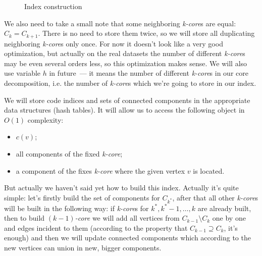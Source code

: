 \begin{figure}[!h]
\caption{Index construction}\label{index-construct}
\centering
  \begin{center}
  \end{center}
\end{figure}
\FloatBarrier

We also need to take a small note that some neighboring \textit{k-core}s are equal: $C_k = C_{k + 1}$. There is no need to store them twice, so we will store all duplicating neighboring \textit{k-core}s only once. For now it doesn't look like a very good optimization, but actually on the real datasets the number of different \textit{k-core}s may be even several orders less, so this optimization makes sense. We will also use variable $h$ in future~--- it means the number of different \textit{k-core}s in our core decomposition, i.e. the number of \textit{k-core}s which we're going to store in our index.

We will store code indices and sets of connected components in the appropriate data structures (hash tables). It will allow us to access the following object in $O(1)$ complexity:
\begin{itemize}
  \item $c(v)$;
  \item all components of the fixed \textit{k-core};
  \item a component of the fixes \textit{k-core} where the given vertex $v$ is located.
\end{itemize}

But actually we haven't said yet how to build this index. Actually it's quite simple: let's firstly build the set of components for $C_{k^*}$, after that all other \textit{k-core}s will be built in the following way: if \textit{k-core}s for $k^*, k^*-1, \ldots, k$ are already built, then to build \textit{$(k - 1)$-core} we will add all vertices from $C_{k - 1} \setminus C_k$ one by one and edges incident to them (according to the property that $C_{k - 1} \supseteq C_k$, it's enough) and then we will update connected components which according to the new vertices can union in new, bigger components.

